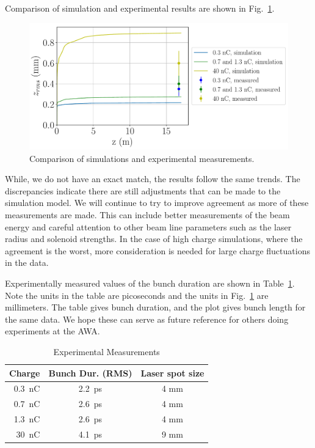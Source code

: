Comparison of simulation and experimental results are shown in Fig.~\ref{sims}.
\begin{figure}[!tbh]
	\centering
	\includegraphics[width=0.8\linewidth]{images/THPMF048f5}
	\caption{Comparison of simulations and experimental measurements.}
	\label{sims}
\end{figure}
While, we do not have an exact match, the results follow the same trends.
The discrepancies indicate there are still adjustments that can be made
to the simulation model. We will continue to try to improve agreement
as more of these measurements are made. 
This can include better measurements of the beam energy and careful attention to other 
beam line parameters such as the laser radius and solenoid strengths.
In the case of high charge simulations, where the agreement is the worst, 
more consideration is needed for large charge fluctuations in the data.

Experimentally measured values of the bunch duration are shown in Table~\ref{exp}.
Note the units in the table are picoseconds and the units in Fig.~\ref{sims} are millimeters.
The table gives bunch duration, and the plot gives bunch length for the same data.
We hope these can serve as future reference for others doing experiments at the AWA.
\begin{table}[h]
	\centering
	\caption{Experimental Measurements}
	\begin{tabular}{rcc}
		\toprule
		\textbf{Charge} & \textbf{Bunch Dur. (RMS)} & \textbf{Laser spot size}  \\
		\midrule
		\SI{0.3}{nC} & \SI{2.2}{ps} & 4 mm    \\ %
		\SI{0.7}{nC} & \SI{2.6}{ps} & 4 mm   \\ %
		\SI{1.3}{nC} & \SI{2.6}{ps} & 4 mm    \\
		\SI{30}{nC}  & \SI{4.1}{ps} & 9 mm \\ %
		\bottomrule
	\end{tabular}
	\label{exp}
\end{table}




